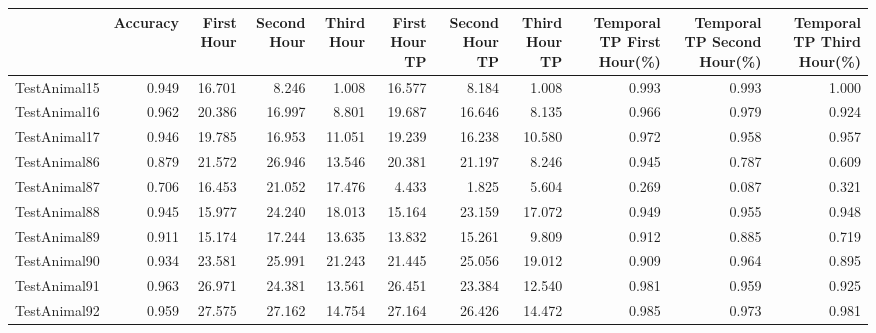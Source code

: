 \begin{tabular}{lrrrrrrrrrr}
\toprule
{} &  Accuracy &  First Hour &  Second Hour &  Third Hour &  First Hour TP &  Second Hour TP &  Third Hour TP &  Temporal TP First Hour(\%) &  Temporal TP Second Hour(\%) &  Temporal TP Third Hour(\%) \\
\midrule
TestAnimal15  &     0.949 &      16.701 &        8.246 &       1.008 &         16.577 &           8.184 &          1.008 &                      0.993 &                       0.993 &                      1.000 \\
TestAnimal16  &     0.962 &      20.386 &       16.997 &       8.801 &         19.687 &          16.646 &          8.135 &                      0.966 &                       0.979 &                      0.924 \\
TestAnimal17  &     0.946 &      19.785 &       16.953 &      11.051 &         19.239 &          16.238 &         10.580 &                      0.972 &                       0.958 &                      0.957 \\
TestAnimal86  &     0.879 &      21.572 &       26.946 &      13.546 &         20.381 &          21.197 &          8.246 &                      0.945 &                       0.787 &                      0.609 \\
TestAnimal87  &     0.706 &      16.453 &       21.052 &      17.476 &          4.433 &           1.825 &          5.604 &                      0.269 &                       0.087 &                      0.321 \\
TestAnimal88  &     0.945 &      15.977 &       24.240 &      18.013 &         15.164 &          23.159 &         17.072 &                      0.949 &                       0.955 &                      0.948 \\
TestAnimal89  &     0.911 &      15.174 &       17.244 &      13.635 &         13.832 &          15.261 &          9.809 &                      0.912 &                       0.885 &                      0.719 \\
TestAnimal90  &     0.934 &      23.581 &       25.991 &      21.243 &         21.445 &          25.056 &         19.012 &                      0.909 &                       0.964 &                      0.895 \\
TestAnimal91  &     0.963 &      26.971 &       24.381 &      13.561 &         26.451 &          23.384 &         12.540 &                      0.981 &                       0.959 &                      0.925 \\
TestAnimal92  &     0.959 &      27.575 &       27.162 &      14.754 &         27.164 &          26.426 &         14.472 &                      0.985 &                       0.973 &                      0.981 \\

\end{tabular}
